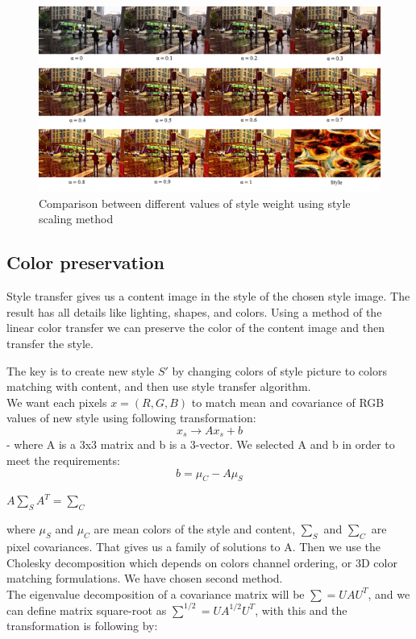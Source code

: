 \documentclass[../Main.tex]{subfiles}
\begin{document}
\begin{figure}[ht!]
    \centering
    \includegraphics[scale=0.75]{Images/style1.png}
    \caption{Comparison between different values of style weight using style scaling method}
    \label{fig:style1}
\end{figure}

\subsection{Color preservation}
Style transfer gives us a content image in the style of the chosen style image. The result has all details like lighting, shapes, and colors. Using a method of the linear color transfer we can preserve the color of the content image and then transfer the style.

The key is to create new style $S'$ by changing colors of style picture to colors matching with content, and then use style transfer algorithm. \\
We want each pixels $x=(R,G,B)$ to match mean and covariance of RGB values of new style using following transformation: $$x_s\rightarrow{}Ax_s+b$$ - where A is a 3x3 matrix and b is a 3-vector. We selected A and b in order to meet the requirements:
 $$b=\mu_C - A\mu_S$$ 
\begin{center}
    $A\sum_SA^T = \sum_C$
\end{center}
where $\mu_S$ and $\mu_C$ are mean colors of the style and content, $\sum_S$ and $\sum_C$ are pixel covariances. That gives us a family of solutions to A. Then we use the Cholesky decomposition which depends on colors channel ordering, or 3D color matching formulations. We have chosen second method. \\
The eigenvalue decomposition of a covariance matrix will be $\sum=UAU^T$, and we can define matrix square-root as $\sum^{1/2}=UA^{1/2}U^T$, with this and the transformation is following by:
\end{document}
